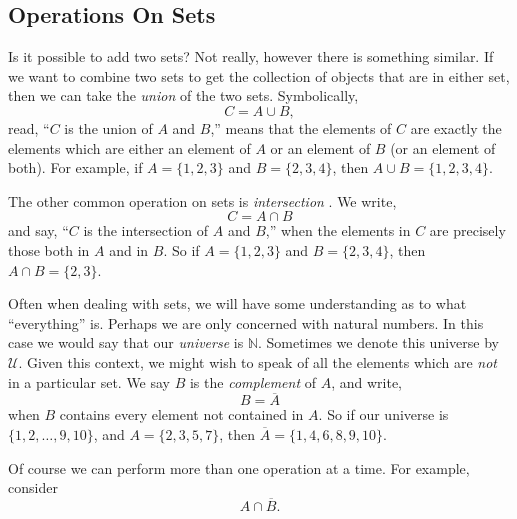 \documentclass[10pt,]{book}
\theoremstyle{plain}
\theoremstyle{definition}
\theoremstyle{definition}
\theoremstyle{definition}
\numberwithin{equation}{section}
\def\N{\mathbb N}
\def\U{\mathcal U}
\def\bar{\overline}
\begin{document}
\subsection[Operations On Sets]{Operations On Sets}\label{subsection-5}

      Is it possible to add two sets? Not really, however there is something similar. If we want to combine two sets to get the collection of objects that are in either set, then we can take the \emph{union}
       of the two sets. Symbolically,
      \begin{equation*}
        C = A \cup B,
      \end{equation*}
      read, ``\(C\) is the union of \(A\) and \(B\),'' means that the elements of \(C\) are exactly the elements which are either an element of \(A\) or an element of \(B\) (or an element of both). For example, if \(A = \{1, 2, 3\}\)      and \(B = \{2, 3, 4\}\), then \(A \cup B = \{1, 2, 3, 4\}\).
\par

      The other common operation on sets is \emph{intersection}
      . We write,
      \begin{equation*}
        C = A \cap B
      \end{equation*}
      and say, ``\(C\) is the intersection of \(A\) and \(B\),'' when the elements in \(C\) are precisely those both in \(A\) and in \(B\). So if \(A = \{1, 2, 3\}\) and \(B = \{2, 3, 4\}\), then \(A \cap B = \{2, 3\}\).
\par

      Often when dealing with sets, we will have some understanding as to what ``everything'' is. Perhaps we are only concerned with natural numbers. In this case we would say that our \emph{universe} is \(\N\). Sometimes we denote this universe
      by \(\U\). Given this context, we might wish to speak of all the elements which are \emph{not} in a particular set. We say \(B\) is the \emph{complement}
       of \(A\), and write,
      \begin{equation*}
        B = \bar A
      \end{equation*}
      when \(B\) contains every element not contained in \(A\). So if our universe is \(\{1, 2,\ldots, 9, 10\}\), and \(A = \{2, 3, 5, 7\}\), then \(\bar A = \{1, 4, 6, 8, 9,10\}\).
\par

      Of course we can perform more than one operation at a time. For example, consider
      \begin{equation*}
        A \cap \bar B.
      \end{equation*}
\par
\end{document}
